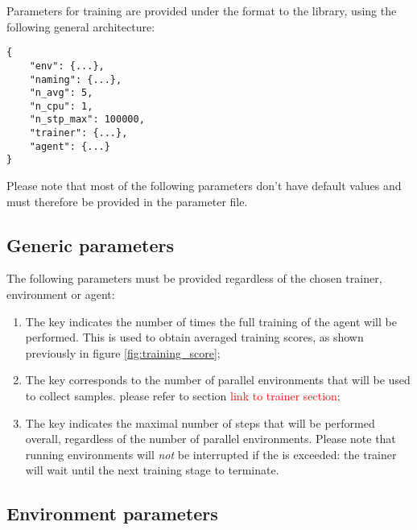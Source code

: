 Parameters for training are provided under the  format to the library, using the following general architecture:

\begin{verbatim}
{
	"env": {...},
	"naming": {...},
	"n_avg": 5,
	"n_cpu": 1,
	"n_stp_max": 100000,
	"trainer": {...},
	"agent": {...}
}
\end{verbatim}

Please note that most of the following parameters don't have default values and must therefore be provided in the parameter file.

\subsection{Generic parameters}
\label{section:generic_parameters}

The following parameters must be provided regardless of the chosen trainer, environment or agent:

\begin{enumerate}
	\item The  key indicates the number of times the full training of the agent will be performed. This is used to obtain averaged training scores, as shown previously in figure \ref{fig:training_score};
	\item The  key corresponds to the number of parallel environments that will be used to collect samples.  please refer to section \textcolor{red}{link to trainer section};
	\item The  key indicates the maximal number of steps that will be performed overall, regardless of the number of parallel environments. Please note that running environments will \emph{not} be interrupted if the  is exceeded: the trainer will wait until the next training stage to terminate.
\end{enumerate}

\subsection{Environment parameters}
\label{section:env_parameters}

